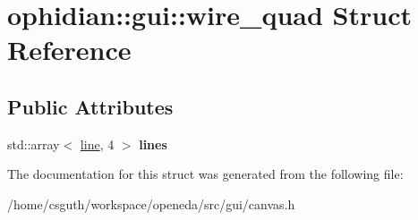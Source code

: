 \hypertarget{structophidian_1_1gui_1_1wire__quad}{\section{ophidian\-:\-:gui\-:\-:wire\-\_\-quad Struct Reference}
\label{structophidian_1_1gui_1_1wire__quad}
}
\subsection*{Public Attributes}
\begin{DoxyCompactItemize}
\item 
\hypertarget{structophidian_1_1gui_1_1wire__quad_ad99e193c49b259484bca5ff818224737}{std\-::array$<$ \hyperlink{structophidian_1_1gui_1_1line}{line}, 4 $>$ {\bfseries lines}}\label{structophidian_1_1gui_1_1wire__quad_ad99e193c49b259484bca5ff818224737}

\end{DoxyCompactItemize}


The documentation for this struct was generated from the following file\-:\begin{DoxyCompactItemize}
\item 
/home/csguth/workspace/openeda/src/gui/canvas.\-h\end{DoxyCompactItemize}
